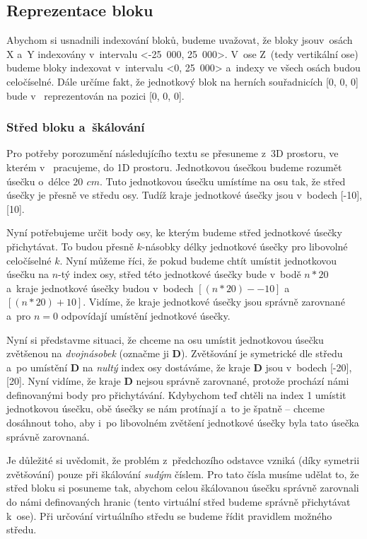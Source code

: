 \subsection{Reprezentace bloku}

Abychom si usnadnili indexování bloků, budeme uvažovat, že bloky jsou\linebreak v~osách X a~Y indexovány v~intervalu <-25~000, 25~000>. V~ose Z~(tedy vertikální ose) budeme bloky indexovat v~intervalu <0, 25~000> a~indexy ve všech osách budou celočíselné. Dále určíme fakt, že jednotkový blok na herních souřadnicích [0, 0, 0] bude v~\UEu{} reprezentován na pozici [0, 0, 0]. 

\subsubsection{Střed bloku a~škálování}
Pro potřeby porozumění následujícího textu se přesuneme z~3D prostoru, ve kterém v~\UEu{} pracujeme, do 1D prostoru. Jednotkovou úsečkou budeme rozumět úsečku o~délce $20\,\ cm$. Tuto jednotkovou úsečku umístíme na osu tak, že střed úsečky je přesně ve středu osy. Tudíž kraje jednotkové úsečky jsou v~bodech [-10], [10].

Nyní potřebujeme určit body osy, ke kterým budeme střed jednotkové úsečky přichytávat. To budou přesně $k$-násobky délky jednotkové úsečky pro libovolné celočíselné $k$. Nyní můžeme říci, že pokud budeme chtít umístit jednotkovou úsečku na $n$-tý index osy, střed této jednotkové úsečky bude v~bodě $n * 20$ a~kraje jednotkové úsečky budou v~bodech $[(n * 20) -- 10]$ a~$[(n * 20) + 10]$. Vidíme, že kraje jednotkové úsečky jsou správně zarovnané a~pro $n = 0$ odpovídají umístění jednotkové úsečky.

Nyní si představme situaci, že chceme na osu umístit jednotkovou úsečku zvětšenou na \textit{dvojnásobek} (označme ji \textbf{D}). Zvětšování je symetrické dle středu a~po umístění \textbf{D} na \textit{nultý} index osy dostáváme, že kraje \textbf{D} jsou v~bodech [-20], [20]. Nyní vidíme, že kraje \textbf{D} nejsou správně zarovnané, protože prochází námi definovanými body pro přichytávání. Kdybychom teď chtěli na index 1 umístit jednotkovou úsečku, obě úsečky se nám protínají a~to je špatně -- chceme dosáhnout toho, aby i~po libovolném zvětšení jednotkové úsečky byla tato úsečka správně zarovnaná.

Je důležité si uvědomit, že problém z~předchozího odstavce vzniká (díky symetrii zvětšování) pouze při škálování \textit{sudým} číslem. Pro tato čísla musíme udělat to, že střed bloku si  posuneme tak, abychom celou škálovanou úsečku správně zarovnali do námi definovaných hranic (tento virtuální střed budeme správně přichytávat k~ose). Při určování virtuálního středu se budeme řídit pravidlem  možného středu. 

